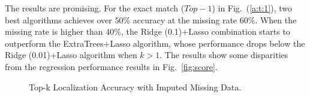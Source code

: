 The results are promising. For the exact match ($Top-1$) in Fig.~(\ref{a:t:1}), two best algorithms achieves over $50\%$ accuracy at the missing rate $60\%$. When the missing rate is higher than $40\%$, the Ridge (0.1)+Lasso combination starts to outperform the ExtraTrees+Lasso algorithm, whose performance drops below the Ridge (0.01)+Lasso algorithm when $k>1$. The results show some disparities from the regression performance results in Fig.~\ref{fig:score}. 
   
    \begin{figure}[!ht]
    \hfill
    \hfill
    \hfill
    
    \caption{Top-k Localization Accuracy with Imputed Missing Data.}
    \label{fig:topk}
  \end{figure}
  
  
  